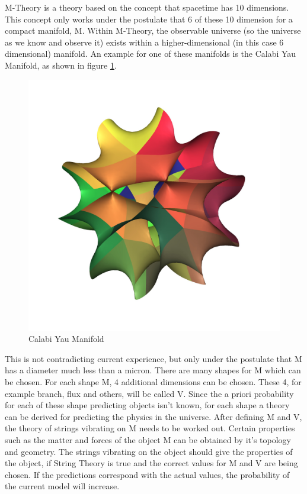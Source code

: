 \documentclass[../paper.tex]{subfiles}
\begin{document}
M-Theory is a theory based on the concept that spacetime has 10 dimensions. This concept only works under the postulate that 6 of these 10 dimension for a compact manifold, M. Within M-Theory, the observable universe (so the universe as we know and observe it) exists within a higher-dimensional (in this case 6 dimensional) manifold. An example for one of these manifolds is the Calabi Yau Manifold, as shown in figure \ref{Calabi Yau}. 

\begin{figure}[!htb]
\centering
\includegraphics[scale = 0.1]{M-Theory/calabiyau.jpg}
\caption{Calabi Yau Manifold}
\label{Calabi Yau}
\end{figure}

This is not contradicting current experience, but only under the postulate that M has a diameter much less than a micron. There are many shapes for M which can be chosen. For each shape M, 4 additional dimensions can be chosen. These 4, for example branch, flux and others,  will be called V. Since the a priori probability for each of these shape predicting objects isn't known, for each shape a theory can be derived for predicting the physics in the universe. After defining M and V, the theory of strings vibrating on M needs to be worked out. Certain properties such as the matter and forces of the object M can be obtained by it's topology and geometry. The strings vibrating on the object should give the properties of the object, if String Theory is true and the correct values for M and V are being chosen. If the predictions correspond with the actual values, the probability of the current model will increase. 
\end{document}

